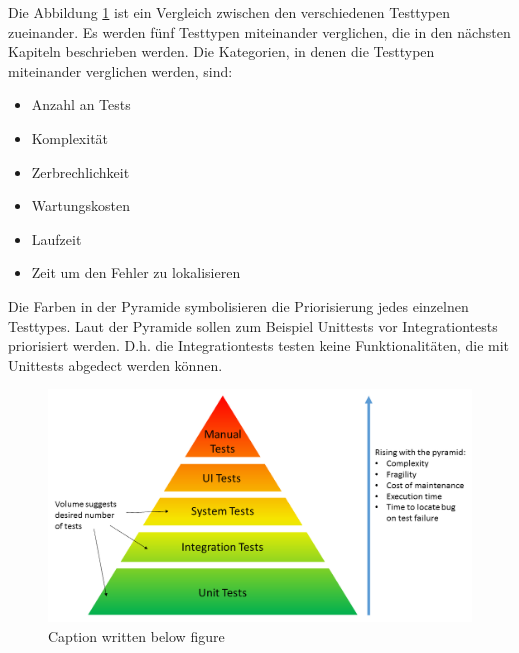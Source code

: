 Die Abbildung \ref{fig:TestingPyramide} ist ein Vergleich zwischen den verschiedenen Testtypen zueinander.
Es werden fünf Testtypen miteinander verglichen, die in den nächsten Kapiteln beschrieben werden. 
Die Kategorien, in denen die Testtypen miteinander verglichen werden, sind:
\begin{itemize}
    \item Anzahl an Tests
    \item Komplexität
    \item Zerbrechlichkeit
    \item Wartungskosten
    \item Laufzeit
    \item Zeit um den Fehler zu lokalisieren
\end{itemize} 
Die Farben in der Pyramide symbolisieren die Priorisierung jedes einzelnen Testtypes.
Laut der Pyramide sollen zum Beispiel Unittests vor Integrationtests priorisiert werden.
D.h. die Integrationtests testen keine Funktionalitäten, die mit Unittests abgedect werden können. 


\begin{figure}[H]
    \centering
    \includegraphics[width=1\textwidth]{Images/test_pyramid.png}
    \caption[Testing Pyramide]{Caption written below figure \footnotemark}
    \label{fig:TestingPyramide}
\end{figure}
